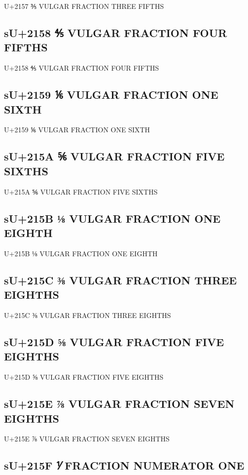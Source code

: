 U+2157 ⅗ VULGAR FRACTION THREE FIFTHS

\subsection{sU+2158 ⅘ VULGAR FRACTION FOUR FIFTHS}

U+2158 ⅘ VULGAR FRACTION FOUR FIFTHS

\subsection{sU+2159 ⅙ VULGAR FRACTION ONE SIXTH}

U+2159 ⅙ VULGAR FRACTION ONE SIXTH

\subsection{sU+215A ⅚ VULGAR FRACTION FIVE SIXTHS}

U+215A ⅚ VULGAR FRACTION FIVE SIXTHS

\subsection{sU+215B ⅛ VULGAR FRACTION ONE EIGHTH}

U+215B ⅛ VULGAR FRACTION ONE EIGHTH

\subsection{sU+215C ⅜ VULGAR FRACTION THREE EIGHTHS}

U+215C ⅜ VULGAR FRACTION THREE EIGHTHS

\subsection{sU+215D ⅝ VULGAR FRACTION FIVE EIGHTHS}

U+215D ⅝ VULGAR FRACTION FIVE EIGHTHS

\subsection{sU+215E ⅞ VULGAR FRACTION SEVEN EIGHTHS}

U+215E ⅞ VULGAR FRACTION SEVEN EIGHTHS

\subsection{sU+215F ⅟ FRACTION NUMERATOR ONE}


